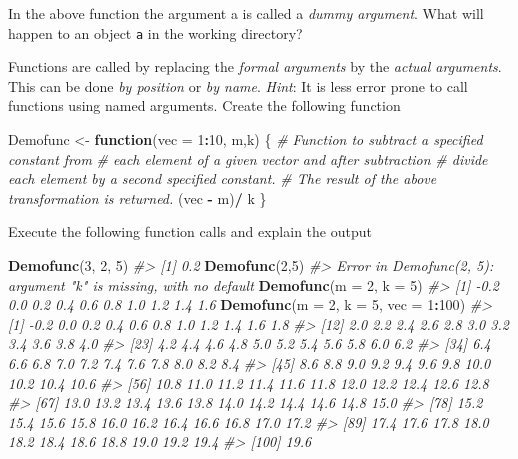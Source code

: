\documentclass[
]{book}
\newenvironment{Shaded}{\begin{snugshade}}{\end{snugshade}}
\newcommand{\AttributeTok}[1]{\textcolor[rgb]{0.13,0.29,0.53}{#1}}
\newcommand{\CommentTok}[1]{\textcolor[rgb]{0.56,0.35,0.01}{\textit{#1}}}
\newcommand{\ControlFlowTok}[1]{\textcolor[rgb]{0.13,0.29,0.53}{\textbf{#1}}}
\newcommand{\DecValTok}[1]{\textcolor[rgb]{0.00,0.00,0.81}{#1}}
\newcommand{\FunctionTok}[1]{\textcolor[rgb]{0.13,0.29,0.53}{\textbf{#1}}}
\newcommand{\NormalTok}[1]{#1}
\newcommand{\OtherTok}[1]{\textcolor[rgb]{0.56,0.35,0.01}{#1}}
\newcommand{\SpecialCharTok}[1]{\textcolor[rgb]{0.81,0.36,0.00}{\textbf{#1}}}
\begin{document}
In the above function the argument a is called a \emph{{dummy argument}}. What will happen to an object \texttt{a} in the working directory?

Functions are called by replacing the \emph{{formal arguments}} by the \emph{{actual arguments}}. This can be done \emph{{by position}} or \emph{{by name}}. \emph{Hint}: It is less error prone to call functions using named arguments. Create the following function

\begin{Shaded}
\begin{Highlighting}[]
\NormalTok{Demofunc }\OtherTok{\textless{}{-}} \ControlFlowTok{function}\NormalTok{(}\AttributeTok{vec =} \DecValTok{1}\SpecialCharTok{:}\DecValTok{10}\NormalTok{, m,k)}
\NormalTok{ \{ }\CommentTok{\# Function to subtract a specified constant from}
   \CommentTok{\# each element of a given vector and after subtraction}
   \CommentTok{\# divide each element by a second specified constant.}
   \CommentTok{\# The result of the above transformation is returned.}
\NormalTok{ (vec }\SpecialCharTok{{-}}\NormalTok{ m)}\SpecialCharTok{/}\NormalTok{ k }
\NormalTok{\}}
\end{Highlighting}
\end{Shaded}

Execute the following function calls and explain the output

\begin{Shaded}
\begin{Highlighting}[]
\FunctionTok{Demofunc}\NormalTok{(}\DecValTok{3}\NormalTok{, }\DecValTok{2}\NormalTok{, }\DecValTok{5}\NormalTok{)}
\CommentTok{\#\textgreater{} [1] 0.2}
\FunctionTok{Demofunc}\NormalTok{(}\DecValTok{2}\NormalTok{,}\DecValTok{5}\NormalTok{)}
\CommentTok{\#\textgreater{} Error in Demofunc(2, 5): argument "k" is missing, with no default}
\FunctionTok{Demofunc}\NormalTok{(}\AttributeTok{m =} \DecValTok{2}\NormalTok{, }\AttributeTok{k =} \DecValTok{5}\NormalTok{)}
\CommentTok{\#\textgreater{}  [1] {-}0.2  0.0  0.2  0.4  0.6  0.8  1.0  1.2  1.4  1.6}
\FunctionTok{Demofunc}\NormalTok{(}\AttributeTok{m =} \DecValTok{2}\NormalTok{, }\AttributeTok{k =} \DecValTok{5}\NormalTok{, }\AttributeTok{vec =} \DecValTok{1}\SpecialCharTok{:}\DecValTok{100}\NormalTok{)}
\CommentTok{\#\textgreater{}   [1] {-}0.2  0.0  0.2  0.4  0.6  0.8  1.0  1.2  1.4  1.6  1.8}
\CommentTok{\#\textgreater{}  [12]  2.0  2.2  2.4  2.6  2.8  3.0  3.2  3.4  3.6  3.8  4.0}
\CommentTok{\#\textgreater{}  [23]  4.2  4.4  4.6  4.8  5.0  5.2  5.4  5.6  5.8  6.0  6.2}
\CommentTok{\#\textgreater{}  [34]  6.4  6.6  6.8  7.0  7.2  7.4  7.6  7.8  8.0  8.2  8.4}
\CommentTok{\#\textgreater{}  [45]  8.6  8.8  9.0  9.2  9.4  9.6  9.8 10.0 10.2 10.4 10.6}
\CommentTok{\#\textgreater{}  [56] 10.8 11.0 11.2 11.4 11.6 11.8 12.0 12.2 12.4 12.6 12.8}
\CommentTok{\#\textgreater{}  [67] 13.0 13.2 13.4 13.6 13.8 14.0 14.2 14.4 14.6 14.8 15.0}
\CommentTok{\#\textgreater{}  [78] 15.2 15.4 15.6 15.8 16.0 16.2 16.4 16.6 16.8 17.0 17.2}
\CommentTok{\#\textgreater{}  [89] 17.4 17.6 17.8 18.0 18.2 18.4 18.6 18.8 19.0 19.2 19.4}
\CommentTok{\#\textgreater{} [100] 19.6}
\end{Highlighting}
\end{Shaded}
\end{document}
